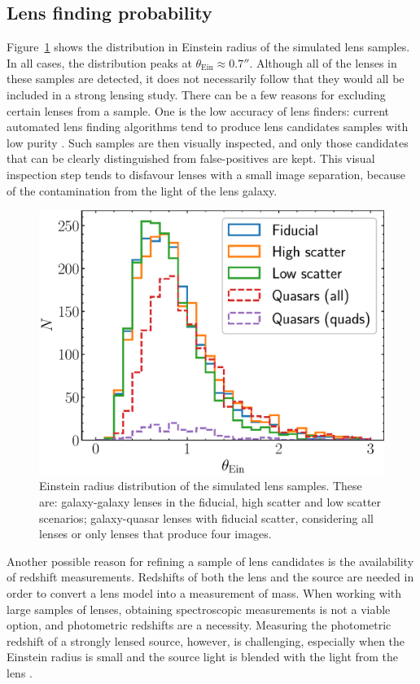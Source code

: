 \documentclass{aa}
\def\tein{\theta_{\mathrm{Ein}}}
\def\Fref#1{Figure~\ref{#1}\xspace}
\begin{document}
\subsection{Lens finding probability}\label{ssec:teincuts}

\Fref{fig:teinhist} shows the distribution in Einstein radius of the simulated lens samples.
In all cases, the distribution peaks at $\tein\approx0.7''$.
Although all of the lenses in these samples are detected, it does not necessarily follow that they would all be included in a strong lensing study.
There can be a few reasons for excluding certain lenses from a sample. 
One is the low accuracy of lens finders: current automated lens finding algorithms tend to produce lens candidates samples with low purity \citep[see e.g.][]{Son++18a,Pet++19,Sav++22}. Such samples are then visually inspected, and only those candidates that can be clearly distinguished from false-positives are kept. This visual inspection step tends to disfavour lenses with a small image separation, because of the contamination from the light of the lens galaxy.
\begin{figure}
\includegraphics[width=\columnwidth]{tein_hist.eps}
\caption{
Einstein radius distribution of the simulated lens samples.
These are: galaxy-galaxy lenses in the fiducial, high scatter and low scatter scenarios; galaxy-quasar lenses with fiducial scatter, considering all lenses or only lenses that produce four images.
\label{fig:teinhist}
}
\end{figure}

Another possible reason for refining a sample of lens candidates is the availability of redshift measurements. Redshifts of both the lens and the source are needed in order to convert a lens model into a measurement of mass. When working with large samples of lenses, obtaining spectroscopic measurements is not a viable option, and photometric redshifts are a necessity. Measuring the photometric redshift of a strongly lensed source, however, is challenging, especially when the Einstein radius is small and the source light is blended with the light from the lens \citep{Lan++23}.
\end{document}
